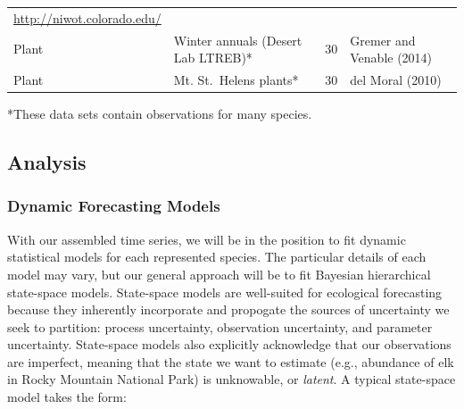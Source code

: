 \documentclass[12pt,]{article}
\begin{document}
\begin{longtable}[]{@{}llll@{}}
\begin{minipage}[t]{0.28\columnwidth}
\url{http://niwot.colorado.edu/}\strut
\end{minipage}\tabularnewline
\begin{minipage}[t]{0.06\columnwidth}\raggedright\strut
Plant\strut
\end{minipage} & \begin{minipage}[t]{0.32\columnwidth}\raggedright\strut
Winter annuals (Desert Lab LTREB)*\strut
\end{minipage} & \begin{minipage}[t]{0.22\columnwidth}\raggedright\strut
30\strut
\end{minipage} & \begin{minipage}[t]{0.28\columnwidth}\raggedright\strut
Gremer and Venable (2014)\strut
\end{minipage}\tabularnewline
\begin{minipage}[t]{0.06\columnwidth}\raggedright\strut
Plant\strut
\end{minipage} & \begin{minipage}[t]{0.32\columnwidth}\raggedright\strut
Mt. St.~Helens plants*\strut
\end{minipage} & \begin{minipage}[t]{0.22\columnwidth}\raggedright\strut
30\strut
\end{minipage} & \begin{minipage}[t]{0.28\columnwidth}\raggedright\strut
del Moral (2010)\strut
\end{minipage}\tabularnewline
\bottomrule
\end{longtable}

\vspace{-2em} *These data sets contain observations for many species.

\normalsize

\subsection{Analysis}\subsubsection{Dynamic Forecasting Models}

With our assembled time series, we will be in the position to fit
dynamic statistical models for each represented species. The particular
details of each model may vary, but our general approach will be to fit
Bayesian hierarchical state-space models. State-space models are
well-suited for ecological forecasting because they inherently
incorporate and propogate the sources of uncertainty we seek to
partition: process uncertainty, observation uncertainty, and parameter
uncertainty. State-space models also explicitly acknowledge that our
observations are imperfect, meaning that the state we want to estimate
(e.g., abundance of elk in Rocky Mountain National Park) is unknowable,
or \emph{latent}. A typical state-space model takes the form:
\vspace{-2em}
\end{document}
